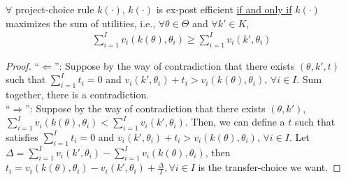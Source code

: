 \documentclass[11pt]{elegantbook}
\begin{document}
\begin{proposition}
    $\forall$ project-choice rule $k(\cdot)$, $k(\cdot)$ is ex-post efficient \underline{if and only if} $k(\cdot)$ maximizes the sum of utilities, i.e., $\forall \theta\in\Theta$ and $\forall k'\in K$,
    \begin{equation}
        \begin{aligned}
            \sum_{i=1}^I v_i(k(\theta),\theta_i)\geq \sum_{i=1}^I v_i(k',\theta_i)
        \end{aligned}
        \nonumber
    \end{equation}
\end{proposition}
\begin{proof}
    ``$\Leftarrow$'': Suppose by the way of contradiction that there exists $\left(\theta, k', t\right)$ such that $\sum_{i=1}^I t_i=0$ and $v_i(k',\theta_i)+t_i> v_i(k(\theta),\theta_i)$, $\forall i\in I$. Sum together, there is a contradiction.\\
    ``$\Rightarrow$'': Suppose by the way of contradiction that there exists $(\theta,k')$, $\sum_{i=1}^I v_i(k(\theta),\theta_i)<\sum_{i=1}^I v_i(k',\theta_i)$. Then, we can define a $t$ such that satisfies $\sum_{i=1}^I t_i=0$ and $v_i(k',\theta_i)+t_i> v_i(k(\theta),\theta_i)$, $\forall i\in I$. Let $\Delta=\sum_{i=1}^I v_i(k',\theta_i)-\sum_{i=1}^I v_i(k(\theta),\theta_i)$, then $t_i=v_i(k(\theta),\theta_i)-v_i(k',\theta_i)+\frac{\Delta}{I},\forall i\in I$ is the transfer-choice we want.
\end{proof}
\end{document}
